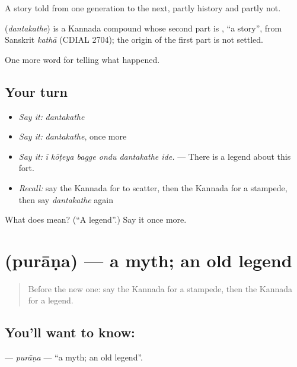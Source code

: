 A story told from one generation to the next, partly history and partly not.

\begin{cousinweb}
\textbf{} (\emph{dantakathe}) is a Kannada compound whose second part is , \textquotedblleft{}a story\textquotedblright{}, from Sanskrit \emph{kathā} (CDIAL 2704); the origin of the first part is not settled.
\end{cousinweb}

\begin{grammarlens}[title={What you've built}]
One more word for telling what happened.
\end{grammarlens}

\subsection*{Your turn}
\begin{itemize}
\raggedright
  \item \emph{Say it:} \emph{dantakathe}
  \item \emph{Say it:} \emph{dantakathe}, once more
  \item \emph{Say it:} \emph{ī kōṭeya bagge ondu dantakathe ide.} — There is a legend about this fort.
  \item \emph{Recall:} say the Kannada for to scatter, then the Kannada for a stampede, then say \emph{dantakathe} again
\end{itemize}

\begin{tcolorbox}[breakable,colback=teal!4,colframe=teal!35!black,title={Before you move on}]
What does  mean? (\textquotedblleft{}A legend\textquotedblright{}.) Say it once more.
\end{tcolorbox}
\section[\texorpdfstring{\kn{ಪುರಾಣ} (purāṇa)}{ಪುರಾಣ (purāṇa)}]{ (purāṇa) — a myth; an old legend}

\label{lesson:KA-C340-purana}



\begin{quote}
Before the new one: say the Kannada for a stampede, then the Kannada for a legend.
\end{quote}

\subsection*{You'll want to know: }
\textbf{} — \emph{purāṇa} — \textquotedblleft{}a myth; an old legend\textquotedblright{}.

